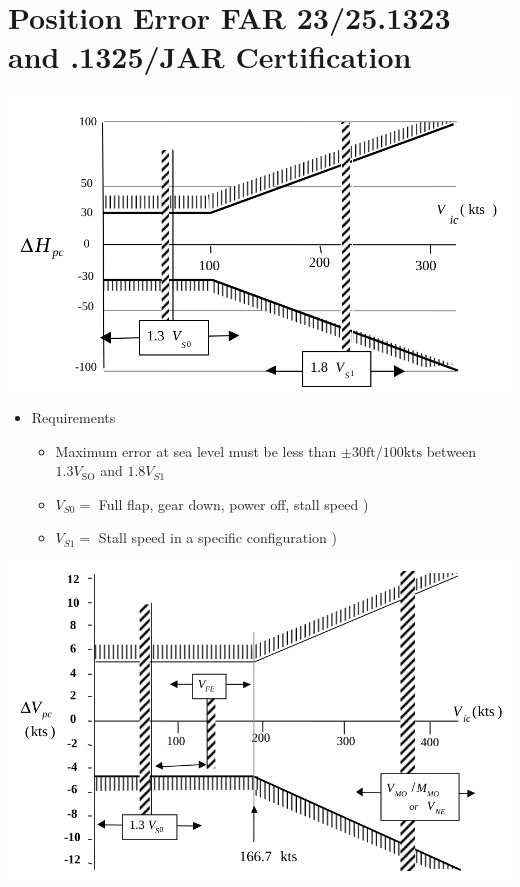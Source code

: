 \documentclass[
]{book}
\providecommand{\tightlist}{%
  \setlength{\itemsep}{0pt}\setlength{\parskip}{0pt}}
\begin{document}
\hypertarget{position-error-far-2325.1323-and-.1325jar-certification}{%
\section{Position Error FAR 23/25.1323 and .1325/JAR Certification}\label{position-error-far-2325.1323-and-.1325jar-certification}}

\includegraphics{media/04/image47.svg}

\begin{itemize}
\tightlist
\item
  Requirements

  \begin{itemize}
  \tightlist
  \item
    Maximum error at sea level must be less than \(\pm 30 \text{ft}/100 \text{kts}\) between \(1.3 V_{\mathrm{SO}}\) and \(1.8 V_{S1}\)
  \item
    \(V_{S0} =\) Full flap, gear down, power off, stall speed )
  \item
    \(V_{S1} =\) Stall speed in a specific configuration )
  \end{itemize}
\end{itemize}

\includegraphics{media/04/image48.svg}
\end{document}
